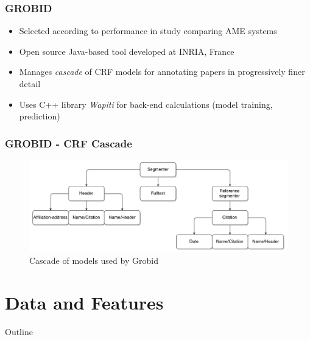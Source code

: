 \documentclass{beamer}
\begin{document}

\begin{frame}
\frametitle{GROBID}
\begin{itemize}
\item Selected according to performance in study comparing AME systems \cite{
lipinski2013evaluation}
\item Open source Java-based tool developed at INRIA, France
\item Manages \emph{cascade} of CRF models for annotating papers in progressively finer detail
\item Uses C++ library \emph{Wapiti} for back-end calculations (model training, prediction)
\end{itemize}
\end{frame}


\begin{frame}
\frametitle{GROBID - CRF Cascade}
\begin{figure}[h]
\center
\includegraphics[width=\textwidth]{Figures/cascade.pdf}
\caption{Cascade of models used by Grobid}
\end{figure}
\end{frame}


\section{Data and Features}


\begin{frame}[noframenumbering]{Outline}
\end{frame}

\end{document}
